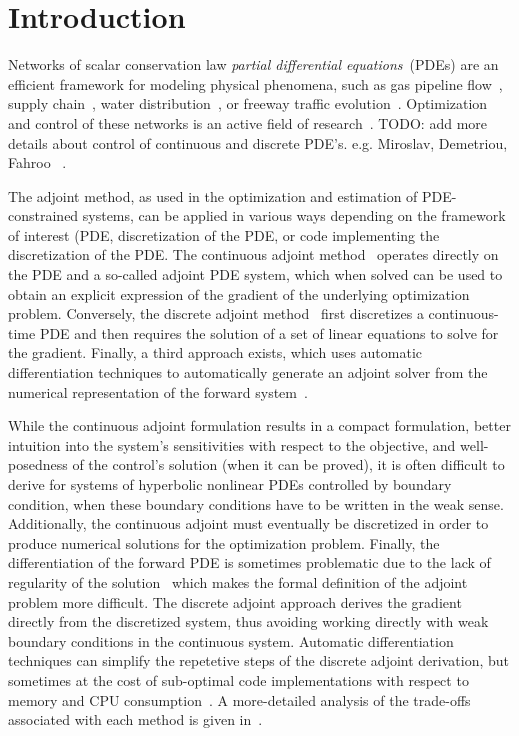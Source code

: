 \section{Introduction} %
\label{sec:introduction}

Networks of scalar conservation law \textit{partial differential 
equations}~(PDEs) are an efficient framework for modeling physical phenomena, 
such as gas pipeline flow~\cite{Rothfarb1970}, supply 
chain~\cite{Brunnermeier1999}, water distribution~\cite{Nguyen}, or freeway 
traffic evolution~\cite{garavello2006traffic,work2010traffic}. Optimization and 
control of these networks is an active field of 
research~\cite{Gugat2005,Bayen2006,Kotsialos2004}. TODO: add more details about 
control of continuous and discrete PDE's. e.g. Miroslav, Demetriou, Fahroo 
~\cite{Fahroo2000,Krstic2008}.

The adjoint method, as used in the optimization and estimation of 
PDE-constrained systems, can be applied in various ways depending on the 
framework of interest (PDE, discretization of the PDE, or code implementing the 
discretization of the PDE. The continuous adjoint 
method~\cite{Jacquet2005,Gugat2005,Moin1994,Reuther1996} operates directly on 
the PDE and a so-called adjoint PDE system, which when solved can be used to 
obtain an explicit 
expression of the gradient of the underlying optimization problem. Conversely, 
the discrete adjoint 
method~\cite{Giles2000,Gugat2005,Kotsialos2004} first discretizes a 
continuous-time PDE and then requires the solution of a set of linear equations 
to solve for the gradient. Finally, a third approach exists, which uses 
automatic differentiation techniques to automatically generate an adjoint 
solver from the numerical representation of the forward 
system~\cite{Muller2005,Giering1998}.

While the continuous adjoint formulation results in a compact formulation, 
better intuition into the system's sensitivities with respect to the objective, 
and well-posedness of the control's solution (when it can be proved), it is 
often difficult to derive for systems of hyperbolic nonlinear PDEs controlled 
by boundary condition, when these boundary conditions have to be written in the 
weak sense.
Additionally, the continuous adjoint must eventually be discretized in order to 
produce numerical solutions for the optimization problem. Finally, the 
differentiation of the forward PDE is sometimes problematic due to the lack of 
regularity of the solution~\cite{work2010traffic,garavello2006traffic} which 
makes the formal definition of the adjoint problem more difficult.
The discrete adjoint approach derives the gradient directly from the 
discretized system, thus avoiding working directly with weak boundary 
conditions in the continuous system. Automatic differentiation techniques can 
simplify the repetetive 
steps of the discrete adjoint derivation, but sometimes at the cost of 
sub-optimal code implementations with respect to memory and CPU 
consumption~\cite{Giles}. A more-detailed analysis of the trade-offs associated 
with each method is given in~\cite{Giles}.

